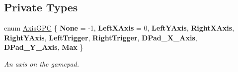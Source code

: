 \subsection*{Private Types}
\begin{DoxyCompactItemize}
\item 
enum \mbox{\hyperlink{class_o_v_r_input_1_1_o_v_r_controller_gamepad_mac_a5d7930d843822a84bc51f463887346e9}{Axis\+G\+PC}} \{ \newline
{\bfseries None} = -\/1, 
{\bfseries Left\+X\+Axis} = 0, 
{\bfseries Left\+Y\+Axis}, 
{\bfseries Right\+X\+Axis}, 
\newline
{\bfseries Right\+Y\+Axis}, 
{\bfseries Left\+Trigger}, 
{\bfseries Right\+Trigger}, 
{\bfseries D\+Pad\+\_\+\+X\+\_\+\+Axis}, 
\newline
{\bfseries D\+Pad\+\_\+\+Y\+\_\+\+Axis}, 
{\bfseries Max}
 \}
\begin{DoxyCompactList}\small\item\em An axis on the gamepad. \end{DoxyCompactList}\end{DoxyCompactItemize}
